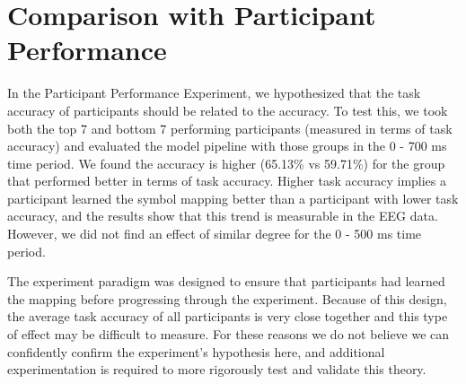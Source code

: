 \section{Comparison with Participant Performance}

In the Participant Performance Experiment, we hypothesized that the task 
accuracy of participants should be related to the \tvt accuracy. To test this, 
we took both the top 7 and bottom 7 performing participants (measured in terms 
of task accuracy) and evaluated the model pipeline with those groups in the 0 - 
700 ms time period.  We found the \tvt accuracy is higher (65.13\% vs 59.71\%) 
for the group that performed better in terms of task accuracy. Higher task 
accuracy implies a participant learned the symbol mapping better than a 
participant with lower task accuracy, and the \tvt results show that this trend 
is measurable in the EEG data.  However, we did not find an effect of similar 
degree for the 0 - 500 ms time period.

The experiment paradigm was designed to ensure that participants had learned 
the mapping before progressing through the experiment. Because of this design, 
the average task accuracy of all participants is very close together and this 
type of effect may be difficult to measure. For these reasons we do not believe 
we can confidently confirm the experiment's hypothesis here, and additional 
experimentation is required to more rigorously test and validate this theory.
